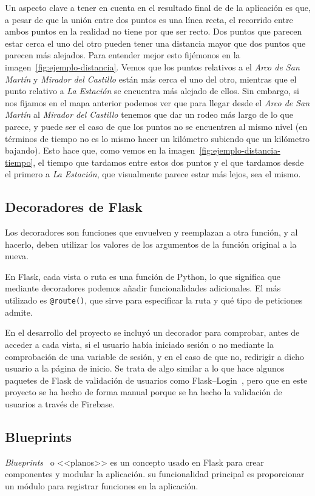 Un aspecto clave a tener en cuenta en el resultado final de de la aplicación es que, a pesar de que la unión entre dos puntos es una línea recta, el recorrido entre ambos puntos en la realidad no tiene por que ser recto. Dos puntos que parecen estar cerca el uno del otro pueden tener una distancia mayor que dos puntos que parecen más alejados. Para entender mejor esto fijémonos en la imagen~\ref{fig:ejemplo-distancia}. Vemos que los puntos relativos a el \textit{Arco de San Martín} y \textit{Mirador del Castillo} están más cerca el uno del otro, mientras que el punto relativo a \textit{La Estación} se encuentra más alejado de ellos.
Sin embargo, si nos fijamos en el mapa anterior podemos ver que para llegar desde el \textit{Arco de San Martín} al \textit{Mirador del Castillo} tenemos que dar un rodeo más largo de lo que parece, y puede ser el caso de que los puntos no se encuentren al mismo nivel (en términos de tiempo no es lo mismo hacer un kilómetro subiendo que un kilómetro bajando). Esto hace que, como vemos en la imagen~\ref{fig:ejemplo-distancia-tiempo}, el tiempo que tardamos entre estos dos puntos y el que tardamos desde el primero a \textit{La Estación}, que visualmente parece estar más lejos, sea el mismo.

\subsection{Decoradores de Flask}
Los decoradores son funciones que envuelven y reemplazan a otra función, y al hacerlo, deben utilizar los valores de los argumentos de la función original a la nueva.

En Flask, cada vista o ruta es una función de Python, lo que significa que mediante decoradores podemos añadir funcionalidades adicionales. El más utilizado es \texttt{@route()}, que sirve para especificar la ruta y qué tipo de peticiones admite. 



En el desarrollo del proyecto se incluyó un decorador para comprobar, antes de acceder a cada vista, si el usuario había iniciado sesión o no mediante la comprobación de una variable de sesión, y en el caso de que no, redirigir a dicho usuario a la página de inicio. Se trata de algo similar a lo que hace algunos paquetes de Flask de validación de usuarios como Flask--Login~\cite{doc-flask-login}, pero que en este proyecto se ha hecho de forma manual porque se ha hecho la validación de usuarios a través de Firebase.



\subsection{Blueprints}
\textit{Blueprints}~\cite{doc:blueprints} o <<planos>> es un concepto usado en Flask para crear componentes y modular la aplicación. su funcionalidad principal es proporcionar un módulo para registrar funciones en la aplicación.



